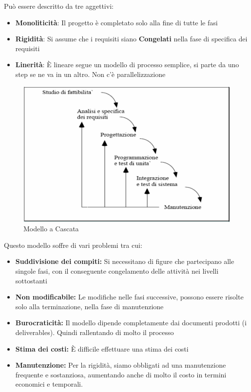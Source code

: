 Pu\`o essere descritto da tre aggettivi:
\begin{itemize}
    \item \textbf{Monoliticit\`a}: 
        Il progetto \`e completato solo alla fine di tutte le fasi
    \item \textbf{Rigidit\`a}:
        Si assume che i requisiti siano \textbf{Congelati} nella fase di specifica dei requisiti
    \item \textbf{Linerit\`a}:
        \`E lineare segue un modello di processo semplice, si parte da uno step se ne va in un altro. Non c'\`e parallelizzazione
\end{itemize}

\begin{figure}[htbp]
    \centering
    \includegraphics[scale=0.5]{cascata.PNG}
    \caption{Modello a Cascata}
    \label{fig:cascata}
\end{figure}
\newpage
Questo modello soffre di vari problemi tra cui:
\begin{itemize}
    \item \textbf{Suddivisione dei compiti:} 
        Si necessitano di figure che partecipano alle singole fasi, con il conseguente congelamento delle attivit\`a nei livelli sottostanti
    \item \textbf{Non modificabile: }
        Le modifiche nelle fasi successive, possono essere risolte solo alla terminazione, nella fase di manutenzione
    \item \textbf{Burocraticit\`a:} 
        Il modello dipende completamente dai documenti prodotti (i deliverables).
        Quindi rallentando di molto il processo
    \item \textbf{Stima dei costi:}
        \`E difficile effettuare una stima dei costi
    \item \textbf{Manutenzione:}
        Per la rigidit\`a, siamo obbligati ad una manutenzione frequente e sostanziosa, aumentando anche di molto il costo in termini economici e temporali.
\end{itemize}
\newpage
